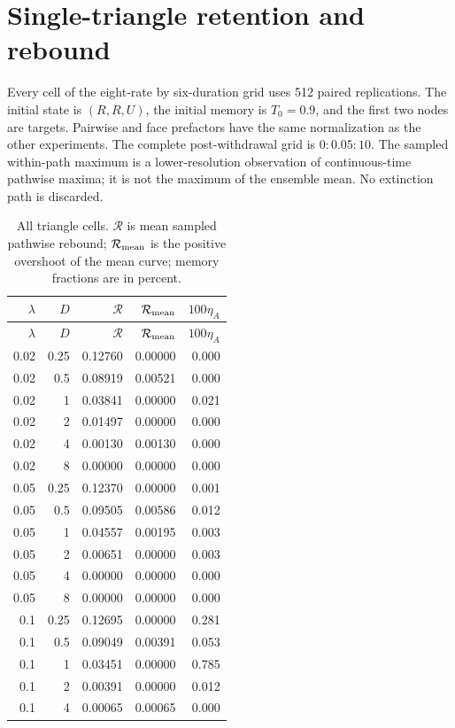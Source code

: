 \documentclass[preprint,11pt,sort&compress]{elsarticle}
\begin{document}
\section{Single-triangle retention and rebound}\label{sec:triangle_new}
Every cell of the eight-rate by six-duration grid uses 512 paired replications. The initial state is $(R,R,U)$, the initial memory is $T_0=0.9$, and the first two nodes are targets. Pairwise and face prefactors have the same normalization as the other experiments. The complete post-withdrawal grid is $0:0.05:10$. The sampled within-path maximum is a lower-resolution observation of continuous-time pathwise maxima; it is not the maximum of the ensemble mean. No extinction path is discarded.
\begin{longtable}{rrrrr}
\caption{All triangle cells. $\mathcal R$ is mean sampled pathwise rebound; $\mathcal R_{\rm mean}$ is the positive overshoot of the mean curve; memory fractions are in percent.}\label{tab:triangle_all}\\
\toprule $\lambda$ & $D$ & $\mathcal R$ & $\mathcal R_{\rm mean}$ & $100\eta_A$\\\midrule\endfirsthead
\toprule $\lambda$ & $D$ & $\mathcal R$ & $\mathcal R_{\rm mean}$ & $100\eta_A$\\\midrule\endhead
0.02 & 0.25 & 0.12760 & 0.00000 & 0.000\\
0.02 & 0.5 & 0.08919 & 0.00521 & 0.000\\
0.02 & 1 & 0.03841 & 0.00000 & 0.021\\
0.02 & 2 & 0.01497 & 0.00000 & 0.000\\
0.02 & 4 & 0.00130 & 0.00130 & 0.000\\
0.02 & 8 & 0.00000 & 0.00000 & 0.000\\
0.05 & 0.25 & 0.12370 & 0.00000 & 0.001\\
0.05 & 0.5 & 0.09505 & 0.00586 & 0.012\\
0.05 & 1 & 0.04557 & 0.00195 & 0.003\\
0.05 & 2 & 0.00651 & 0.00000 & 0.003\\
0.05 & 4 & 0.00000 & 0.00000 & 0.000\\
0.05 & 8 & 0.00000 & 0.00000 & 0.000\\
0.1 & 0.25 & 0.12695 & 0.00000 & 0.281\\
0.1 & 0.5 & 0.09049 & 0.00391 & 0.053\\
0.1 & 1 & 0.03451 & 0.00000 & 0.785\\
0.1 & 2 & 0.00391 & 0.00000 & 0.012\\
0.1 & 4 & 0.00065 & 0.00065 & 0.000\\

\end{longtable}
\end{document}
